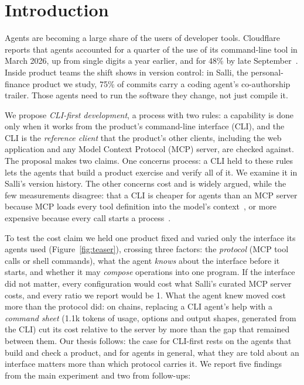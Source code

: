 \documentclass[sigconf,nonacm]{acmart}
\newcommand{\sysA}{Salli}
\begin{document}
\maketitle

\section{Introduction}

Agents are becoming a large share of the users of developer tools. Cloudflare reports that agents accounted for a quarter of the use of its command-line tool in March 2026, up from single digits a year earlier, and for 48\% by late September~\cite{cloudflare2026cf}. Inside product teams the shift shows in version control: in \sysA{}, the personal-finance product we study, 75\% of commits carry a coding agent's co-authorship trailer. Those agents need to run the software they change, not just compile it.

We propose \emph{CLI-first development}, a process with two rules: a capability is done only when it works from the product's command-line interface (CLI), and the CLI is the \emph{reference client} that the product's other clients, including the web application and any Model Context Protocol (MCP) server, are checked against. The proposal makes two claims. One concerns process: a CLI held to these rules lets the agents that build a product exercise and verify all of it. We examine it in \sysA{}'s version history. The other concerns cost and is widely argued, while the few measurements disagree: that a CLI is cheaper for agents than an MCP server because MCP loads every tool definition into the model's context~\cite{schmitt2026circleci,qi2026ibm}, or more expensive because every call starts a process~\cite{mindstudio2026mcpcli}.

To test the cost claim we held one product fixed and varied only the interface its agents used (Figure~\ref{fig:teaser}), crossing three factors: the \emph{protocol} (MCP tool calls or shell commands), what the agent \emph{knows} about the interface before it starts, and whether it may \emph{compose} operations into one program. If the interface did not matter, every configuration would cost what \sysA{}'s curated MCP server costs, and every ratio we report would be 1. What the agent knew moved cost more than the protocol did: on chains, replacing a CLI agent's help with a \emph{command sheet} (1.1k tokens of usage, options and output shapes, generated from the CLI) cut its cost relative to the server by more than the gap that remained between them. Our thesis follows: the case for CLI-first rests on the agents that build and check a product, and for agents in general, what they are told about an interface matters more than which protocol carries it. We report five findings from the main experiment and two from follow-ups:
\end{document}
